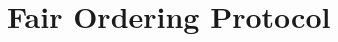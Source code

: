 \documentclass{article}
\newcommand{\pramod}[1]{{\color{red}
\footnotesize[Pramod: #1] }}
\begin{document}







\section*{Fair Ordering Protocol}
\end{document}
